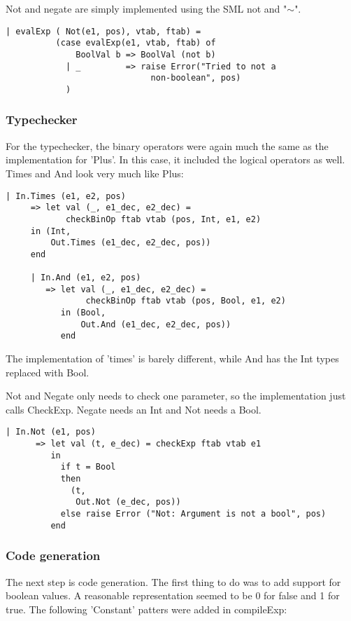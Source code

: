 \documentclass[10pt]{article}
\begin{document}
Not and negate are simply implemented using the SML not and "$\sim$".

\begin{Verbatim}[frame=single]
    | evalExp ( Not(e1, pos), vtab, ftab) =
          (case evalExp(e1, vtab, ftab) of
              BoolVal b => BoolVal (not b)
            | _         => raise Error("Tried to not a
            				 non-boolean", pos)
            )
\end{Verbatim}

\subsubsection{Typechecker}
For the typechecker, the binary operators were again much the same as the implementation for 'Plus'. In this case, it included the logical operators as well. Times and And look very much like Plus:

\begin{Verbatim}[frame=single]
   | In.Times (e1, e2, pos)
     => let val (_, e1_dec, e2_dec) = 
     		checkBinOp ftab vtab (pos, Int, e1, e2)
     in (Int,
         Out.Times (e1_dec, e2_dec, pos))
     end

     | In.And (e1, e2, pos)
        => let val (_, e1_dec, e2_dec) = 
        		checkBinOp ftab vtab (pos, Bool, e1, e2) 
           in (Bool,
               Out.And (e1_dec, e2_dec, pos))
           end
\end{Verbatim}

The implementation of 'times' is barely different, while And has the Int types replaced with Bool. 

Not and Negate only needs to check one parameter, so the implementation just calls CheckExp. Negate needs an Int and Not needs a Bool.

\begin{Verbatim}[frame=single]
   | In.Not (e1, pos)
      => let val (t, e_dec) = checkExp ftab vtab e1
         in
           if t = Bool
           then
             (t,
              Out.Not (e_dec, pos))
           else raise Error ("Not: Argument is not a bool", pos)
         end
\end{Verbatim}

\subsubsection{Code generation}
The next step is  code generation. The first thing to do was to add support for boolean values. A reasonable representation seemed to be 0 for false and 
1 for true. The following 'Constant' patters were added in compileExp:
\end{document}
